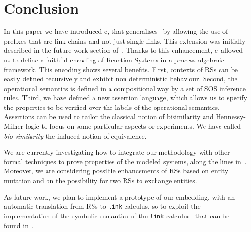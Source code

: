 
\section{Conclusion}\label{sec:conclusion}

In this paper we have introduced c\CNA, that generalises \CNA\ by allowing the use of prefixes that are link chains and not just single links.
This extension was initially described in the future work section of~\cite{BBB17}.
Thanks to this enhancement, c\CNA\ allowed us to define 
a faithful encoding of 
Reaction Systems in a process algebraic framework.  
This encoding
shows several benefits.
First, contexts of RSs can be easily defined recursively and exhibit non deterministic behaviour.
Second, the operational semantics is defined in a compositional way by a set of SOS inference rules.
Third, we have defined a new assertion language, which allows us to specify
the properties to be verified over the labels of the operational semantics.
Assertions can be used to tailor the classical notion of bisimilarity and Hennessy-Milner logic to focus on some particular aspects or experiments. We have called \emph{bio-similarity} the induced notion of equivalence.

We are currently investigating how to integrate our methodology
with other formal techniques to prove 
properties of the modeled systems, along the lines in~\cite{CFHOT15,OCHF16,BBGLBH2017}.
Moreover, we are considering possible enhancements of RSs based on entity mutation and on the possibility for two RSs to exchange entities.

As future work, we plan to implement a prototype of our 
embedding,
with an automatic translation from RSs to  {\tt link}-calculus, so to exploit the implementation of  the symbolic semantics of 
the {\tt link}-calculus~\cite{BrodoO17} that can be found in~\cite{tool}.

